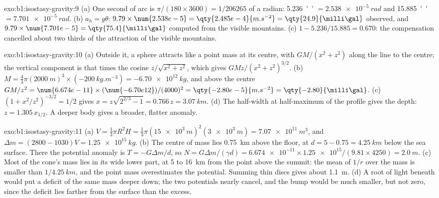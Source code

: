 \begin{solution}{exo:b1:isostasy-gravity:9}
(a) One second of arc is $\pi/(180\times3600) = 1/\num{206265}$ of a radian:
\qty{5.236}{''} $= \qty{2.538e-5}{rad}$ and \qty{15.885}{''} $=
\qty{7.701e-5}{rad}$. (b) $a_h = g\theta$: $9.79\times\num{2.538e-5} =
\qty{2.485e-4}{m.s^{-2}} = \qty{24.9}{\milli\gal}$ observed, and
$9.79\times\num{7.701e-5} = \qty{75.4}{\milli\gal}$ computed from the visible
mountains. (c) $1 - 5.236/15.885 = 0.670$: the compensation cancelled about two
thirds of the attraction of the visible mountains.
\end{solution}

\begin{solution}{exo:b1:isostasy-gravity:10}
(a) Outside it, a sphere attracts like a point mass at its centre, with
$GM/(x^2 + z^2)$ along the line to the centre; the vertical component is that
times the cosine $z/\sqrt{x^2 + z^2}$, which gives $GMz/(x^2 + z^2)^{3/2}$.
(b) $M = \tfrac43\pi(\qty{2000}{m})^3\times(\qty{-200}{kg.m^{-3}}) =
\qty{-6.70e12}{kg}$, and above the centre $GM/z^2 = \num{6.674e-11}\times
(\num{-6.70e12})/(4000)^2 = \qty{-2.80e-5}{m.s^{-2}} = \qty{-2.80}{\milli\gal}$.
(c) $(1 + x^2/z^2)^{-3/2} = 1/2$ gives $x = z\sqrt{2^{2/3} - 1} = 0.766\,z =
\qty{3.07}{km}$. (d) The half-width at half-maximum of the profile gives the
depth: $z = 1.305\,x_{1/2}$. A deeper body gives a broader, flatter anomaly.
\end{solution}

\begin{solution}{exo:b1:isostasy-gravity:11}
(a) $V = \tfrac13\pi R^2 H = \tfrac13\pi(\qty{15e3}{m})^2(\qty{3e3}{m}) =
\qty{7.07e11}{m^3}$, and $\Delta m = (2800 - 1030)V = \qty{1.25e15}{kg}$.
(b) The centre of mass lies \qty{0.75}{km} above the floor, at
$d = 5 - 0.75 = \qty{4.25}{km}$ below the sea surface. There the potential
anomaly is $T = -G\Delta m/d$, so $N = G\Delta m/(\gamma d) =
\num{6.674e-11}\times\num{1.25e15}/(9.81\times4250) = \qty{2.0}{m}$.
(c) Most of the cone's mass lies in its wide lower part, at 5 to
\qty{16}{km} from the point above the summit: the mean of $1/r$ over the mass
is smaller than $1/\qty{4.25}{km}$, and the point mass overestimates the
potential. Summing thin discs gives about \qty{1.1}{m}.
(d) A root of light  beneath would put a deficit of the same mass deeper
down; the two potentials nearly cancel, and the bump would be much smaller,
but not zero, since the deficit lies farther from the surface than the excess.
\end{solution}

